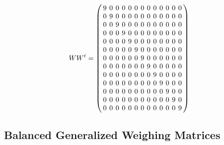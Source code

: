 \documentclass{beamer}
\begin{document}
\begin{frame}
  \[
    WW^t = 
    \arraycolsep=2.0pt\def\arraystretch{1.0}
    \left(
      \begin{array}{ccccccccccccc}
        9&0&0&0&0&0&0&0&0&0&0&0&0\\
        0&9&0&0&0&0&0&0&0&0&0&0&0\\
        0&0&9&0&0&0&0&0&0&0&0&0&0\\
        0&0&0&9&0&0&0&0&0&0&0&0&0\\
        0&0&0&0&9&0&0&0&0&0&0&0&0\\
        0&0&0&0&0&9&0&0&0&0&0&0&0\\
        0&0&0&0&0&0&9&0&0&0&0&0&0\\
        0&0&0&0&0&0&0&9&0&0&0&0&0\\
        0&0&0&0&0&0&0&0&9&0&0&0&0\\
        0&0&0&0&0&0&0&0&0&9&0&0&0\\
        0&0&0&0&0&0&0&0&0&0&9&0&0\\
        0&0&0&0&0&0&0&0&0&0&0&9&0\\
        0&0&0&0&0&0&0&0&0&0&0&0&9\\
      \end{array}
    \right)
  \]
\end{frame}


\subsection{Balanced Generalized Weighing Matrices}
\end{document}
